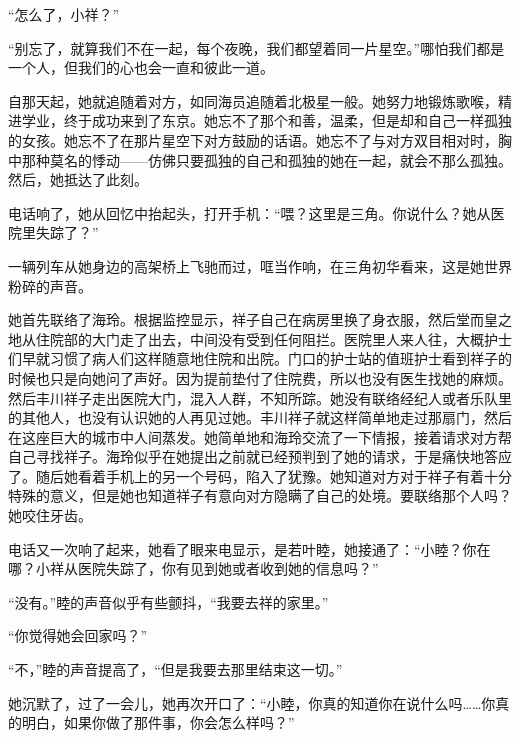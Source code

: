 \documentclass{article}
\begin{document}
“怎么了，小祥？”



“别忘了，就算我们不在一起，每个夜晚，我们都望着同一片星空。”哪怕我们都是一个人，但我们的心也会一直和彼此一道。



自那天起，她就追随着对方，如同海员追随着北极星一般。她努力地锻炼歌喉，精进学业，终于成功来到了东京。她忘不了那个和善，温柔，但是却和自己一样孤独的女孩。她忘不了在那片星空下对方鼓励的话语。她忘不了与对方双目相对时，胸中那种莫名的悸动——仿佛只要孤独的自己和孤独的她在一起，就会不那么孤独。然后，她抵达了此刻。



电话响了，她从回忆中抬起头，打开手机：“喂？这里是三角。你说什么？她从医院里失踪了？”



一辆列车从她身边的高架桥上飞驰而过，哐当作响，在三角初华看来，这是她世界粉碎的声音。



\newpage



她首先联络了海玲。根据监控显示，祥子自己在病房里换了身衣服，然后堂而皇之地从住院部的大门走了出去，中间没有受到任何阻拦。医院里人来人往，大概护士们早就习惯了病人们这样随意地住院和出院。门口的护士站的值班护士看到祥子的时候也只是向她问了声好。因为提前垫付了住院费，所以也没有医生找她的麻烦。然后丰川祥子走出医院大门，混入人群，不知所踪。她没有联络经纪人或者乐队里的其他人，也没有认识她的人再见过她。丰川祥子就这样简单地走过那扇门，然后在这座巨大的城市中人间蒸发。她简单地和海玲交流了一下情报，接着请求对方帮自己寻找祥子。海玲似乎在她提出之前就已经预判到了她的请求，于是痛快地答应了。随后她看着手机上的另一个号码，陷入了犹豫。她知道对方对于祥子有着十分特殊的意义，但是她也知道祥子有意向对方隐瞒了自己的处境。要联络那个人吗？她咬住牙齿。



电话又一次响了起来，她看了眼来电显示，是若叶睦，她接通了：“小睦？你在哪？小祥从医院失踪了，你有见到她或者收到她的信息吗？”



“没有。”睦的声音似乎有些颤抖，“我要去祥的家里。”



“你觉得她会回家吗？”



“不，”睦的声音提高了，“但是我要去那里结束这一切。”



她沉默了，过了一会儿，她再次开口了：“小睦，你真的知道你在说什么吗……你真的明白，如果你做了那件事，你会怎么样吗？”
\end{document}
